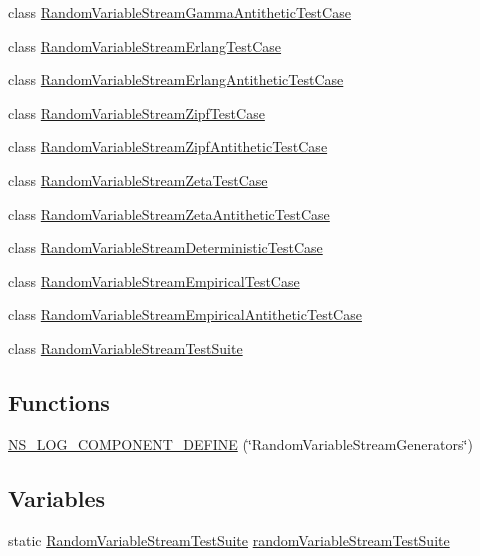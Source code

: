 \begin{DoxyCompactItemize}
\item 
class \hyperlink{classRandomVariableStreamGammaAntitheticTestCase}{Random\+Variable\+Stream\+Gamma\+Antithetic\+Test\+Case}
\item 
class \hyperlink{classRandomVariableStreamErlangTestCase}{Random\+Variable\+Stream\+Erlang\+Test\+Case}
\item 
class \hyperlink{classRandomVariableStreamErlangAntitheticTestCase}{Random\+Variable\+Stream\+Erlang\+Antithetic\+Test\+Case}
\item 
class \hyperlink{classRandomVariableStreamZipfTestCase}{Random\+Variable\+Stream\+Zipf\+Test\+Case}
\item 
class \hyperlink{classRandomVariableStreamZipfAntitheticTestCase}{Random\+Variable\+Stream\+Zipf\+Antithetic\+Test\+Case}
\item 
class \hyperlink{classRandomVariableStreamZetaTestCase}{Random\+Variable\+Stream\+Zeta\+Test\+Case}
\item 
class \hyperlink{classRandomVariableStreamZetaAntitheticTestCase}{Random\+Variable\+Stream\+Zeta\+Antithetic\+Test\+Case}
\item 
class \hyperlink{classRandomVariableStreamDeterministicTestCase}{Random\+Variable\+Stream\+Deterministic\+Test\+Case}
\item 
class \hyperlink{classRandomVariableStreamEmpiricalTestCase}{Random\+Variable\+Stream\+Empirical\+Test\+Case}
\item 
class \hyperlink{classRandomVariableStreamEmpiricalAntitheticTestCase}{Random\+Variable\+Stream\+Empirical\+Antithetic\+Test\+Case}
\item 
class \hyperlink{classRandomVariableStreamTestSuite}{Random\+Variable\+Stream\+Test\+Suite}
\end{DoxyCompactItemize}
\subsection*{Functions}
\begin{DoxyCompactItemize}
\item 
\hyperlink{random-variable-stream-test-suite_8cc_a2897bc1b37d352251304eef42ae95af1}{N\+S\+\_\+\+L\+O\+G\+\_\+\+C\+O\+M\+P\+O\+N\+E\+N\+T\+\_\+\+D\+E\+F\+I\+NE} (\char`\"{}Random\+Variable\+Stream\+Generators\char`\"{})
\end{DoxyCompactItemize}
\subsection*{Variables}
\begin{DoxyCompactItemize}
\item 
static \hyperlink{classRandomVariableStreamTestSuite}{Random\+Variable\+Stream\+Test\+Suite} \hyperlink{random-variable-stream-test-suite_8cc_aec9bef7aa784049f3ba993d3e35039d3}{random\+Variable\+Stream\+Test\+Suite}
\end{DoxyCompactItemize}



